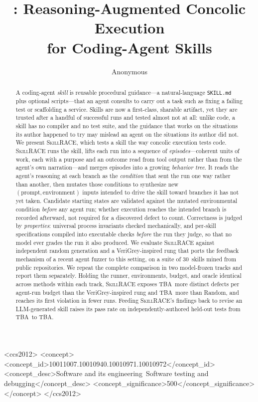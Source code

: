 \documentclass[acmsmall,screen,review,anonymous]{acmart}
\title[\tool: Reasoning-Augmented Concolic Execution for Coding-Agent Skills]{%
  \tool: Reasoning-Augmented Concolic Execution\\for Coding-Agent Skills}
\author{Anonymous}
\affiliation{\institution{Anonymous Institution}\country{Anonymous}}
\newcommand{\ph}[1]{{\color{blue}#1}} %
\newcommand{\tool}{\textsc{SkillRACE}\xspace}
\newcommand{\NumSkills}{30}                  %
\newcommand{\DeltaOverGreybox}{\ph{TBA}}
\newcommand{\DeltaOverRandom}{\ph{TBA}}
\newcommand{\PassZeroShot}{\ph{TBA}}
\newcommand{\PassSkillrace}{\ph{TBA}}
\begin{document}
\begin{abstract}
A coding-agent \emph{skill} is reusable procedural guidance---a natural-language
\texttt{SKILL.md} plus optional scripts---that an agent consults to carry out a
task such as fixing a failing test or scaffolding a service. Skills are now a
first-class, sharable artifact, yet they are trusted after a handful of successful
runs and tested almost not at all: unlike code, a skill has no compiler and no test
suite, and the guidance that works on the situations its author happened to try may
mislead an agent on the situations its author did not. We present \tool, which tests
a skill the way concolic execution tests code. \tool runs the skill, lifts each run
into a sequence of \emph{episodes}---coherent units of work, each with a purpose and
an outcome read from tool output rather than from the agent's own narration---and
merges episodes into a growing \emph{behavior tree}. It reads the agent's reasoning
at each branch as the \emph{condition} that sent the run one way rather than another,
then mutates those conditions to synthesize new \((\text{prompt},\text{environment})\)
inputs intended to drive the skill toward branches it has not yet taken. Candidate
starting states are validated against the mutated environmental condition \emph{before}
any agent run; whether execution reaches the intended branch is recorded afterward, not
required for a discovered defect to count. Correctness is judged by \emph{properties}: universal
process invariants checked mechanically, and per-skill specifications compiled into
executable checks \emph{before} the run they judge, so that no model ever grades the
run it also produced. We evaluate \tool against independent random generation and a
VeriGrey-inspired rung that ports the feedback mechanism of a recent agent fuzzer to this
setting, on a suite of \NumSkills\ skills mined from public repositories. We repeat the
complete comparison in two model-frozen tracks and report them separately. Holding the
runner, environments, budget, and oracle identical across methods within each track, \tool exposes
\DeltaOverGreybox\ more distinct defects per agent-run budget than the VeriGrey-inspired
rung and \DeltaOverRandom\ more than Random, and reaches its first violation in fewer runs.
Feeding \tool's findings back to revise an LLM-generated skill raises its pass rate on
independently-authored held-out tests from \PassZeroShot\ to \PassSkillrace.
\end{abstract}

\begin{CCSXML}
<ccs2012>
<concept>
<concept_id>10011007.10010940.10010971.10010972</concept_id>
<concept_desc>Software and its engineering~Software testing and debugging</concept_desc>
<concept_significance>500</concept_significance>
</concept>
</ccs2012>
\end{CCSXML}
\end{document}
